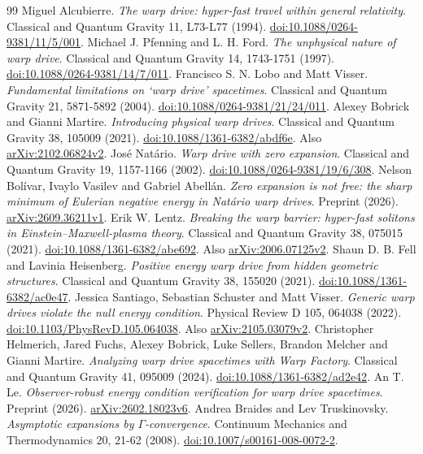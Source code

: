 \begin{thebibliography}{99}
Miguel Alcubierre.
\emph{The warp drive: hyper-fast travel within general relativity}.
Classical and Quantum Gravity 11, L73-L77 (1994).
\href{https://doi.org/10.1088/0264-9381/11/5/001}{doi:10.1088/0264-9381/11/5/001}.
Michael J. Pfenning and L. H. Ford.
\emph{The unphysical nature of warp drive}.
Classical and Quantum Gravity 14, 1743-1751 (1997).
\href{https://doi.org/10.1088/0264-9381/14/7/011}{doi:10.1088/0264-9381/14/7/011}.
Francisco S. N. Lobo and Matt Visser.
\emph{Fundamental limitations on `warp drive' spacetimes}.
Classical and Quantum Gravity 21, 5871-5892 (2004).
\href{https://doi.org/10.1088/0264-9381/21/24/011}{doi:10.1088/0264-9381/21/24/011}.
Alexey Bobrick and Gianni Martire.
\emph{Introducing physical warp drives}.
Classical and Quantum Gravity 38, 105009 (2021).
\href{https://doi.org/10.1088/1361-6382/abdf6e}{doi:10.1088/1361-6382/abdf6e}.
Also \href{https://arxiv.org/abs/2102.06824v2}{arXiv:2102.06824v2}.
José Natário.
\emph{Warp drive with zero expansion}.
Classical and Quantum Gravity 19, 1157-1166 (2002).
\href{https://doi.org/10.1088/0264-9381/19/6/308}{doi:10.1088/0264-9381/19/6/308}.
Nelson Bolívar, Ivaylo Vasilev and Gabriel Abellán.
\emph{Zero expansion is not free: the sharp minimum of Eulerian negative energy in Natário warp drives}.
Preprint (2026).
\href{https://arxiv.org/abs/2609.36211v1}{arXiv:2609.36211v1}.
Erik W. Lentz.
\emph{Breaking the warp barrier: hyper-fast solitons in Einstein--Maxwell-plasma theory}.
Classical and Quantum Gravity 38, 075015 (2021).
\href{https://doi.org/10.1088/1361-6382/abe692}{doi:10.1088/1361-6382/abe692}.
Also \href{https://arxiv.org/abs/2006.07125v2}{arXiv:2006.07125v2}.
Shaun D. B. Fell and Lavinia Heisenberg.
\emph{Positive energy warp drive from hidden geometric structures}.
Classical and Quantum Gravity 38, 155020 (2021).
\href{https://doi.org/10.1088/1361-6382/ac0e47}{doi:10.1088/1361-6382/ac0e47}.
Jessica Santiago, Sebastian Schuster and Matt Visser.
\emph{Generic warp drives violate the null energy condition}.
Physical Review D 105, 064038 (2022).
\href{https://doi.org/10.1103/PhysRevD.105.064038}{doi:10.1103/PhysRevD.105.064038}.
Also \href{https://arxiv.org/abs/2105.03079v2}{arXiv:2105.03079v2}.
Christopher Helmerich, Jared Fuchs, Alexey Bobrick, Luke Sellers, Brandon Melcher and Gianni Martire.
\emph{Analyzing warp drive spacetimes with Warp Factory}.
Classical and Quantum Gravity 41, 095009 (2024).
\href{https://doi.org/10.1088/1361-6382/ad2e42}{doi:10.1088/1361-6382/ad2e42}.
An T. Le.
\emph{Observer-robust energy condition verification for warp drive spacetimes}.
Preprint (2026).
\href{https://arxiv.org/abs/2602.18023v6}{arXiv:2602.18023v6}.
Andrea Braides and Lev Truskinovsky.
\emph{Asymptotic expansions by $\Gamma$-convergence}.
Continuum Mechanics and Thermodynamics 20, 21-62 (2008).
\href{https://doi.org/10.1007/s00161-008-0072-2}{doi:10.1007/s00161-008-0072-2}.
\end{thebibliography}
